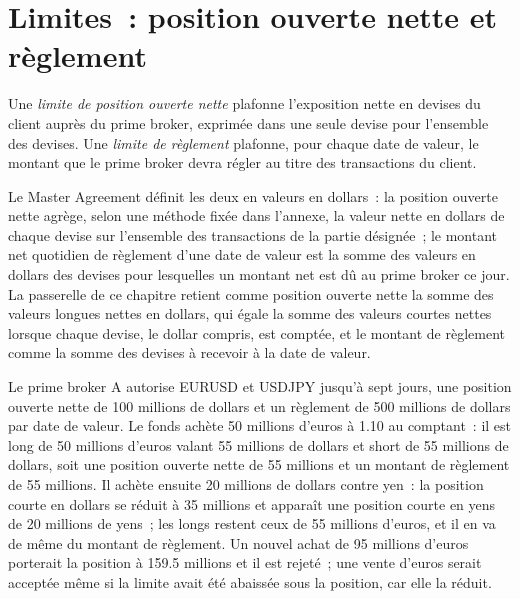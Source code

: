\section{Limites~: position ouverte nette et règlement}

\begin{definition}\label{def:m2:getting-access-fx:limits}
Une \emph{limite de position ouverte nette} plafonne l'exposition
nette en devises du client auprès du prime broker, exprimée dans une seule devise pour l'ensemble
des devises. Une \emph{limite de règlement} plafonne, pour chaque date de valeur,
le montant que le prime broker devra régler au titre des transactions du client.
\end{definition}

Le Master Agreement définit les deux en valeurs en dollars~: la position ouverte nette agrège,
selon une méthode fixée dans l'annexe, la valeur nette en dollars de chaque devise sur l'ensemble
des transactions de la partie désignée~; le montant net quotidien de règlement d'une date de valeur est la somme
des valeurs en dollars des devises pour lesquelles un montant net est dû au prime broker ce
jour. La passerelle de ce chapitre retient comme position ouverte nette la somme des valeurs longues nettes en
dollars, qui égale la somme des valeurs courtes nettes lorsque chaque devise, le dollar
compris, est comptée, et le montant de règlement comme la somme des devises à
recevoir à la date de valeur.

\begin{example}\label{ex:m2:getting-access-fx:nop}
Le prime broker A autorise EURUSD et USDJPY jusqu'à sept jours, une position ouverte nette de 100
millions de dollars et un règlement de 500 millions de dollars par date de valeur. Le fonds achète 50 millions d'euros
à 1.10 au comptant~: il est long de 50 millions d'euros valant 55 millions de dollars et short de 55 millions de dollars, soit une
position ouverte nette de 55 millions et un montant de règlement de 55 millions. Il achète ensuite 20
millions de dollars contre yen~: la position courte en dollars se réduit à 35 millions et apparaît une position courte en yens de 20
millions de yens~; les longs restent ceux de 55 millions d'euros, et il en va de même du montant
de règlement. Un nouvel achat de 95 millions d'euros porterait la position à 159.5 millions
et il est rejeté~; une vente d'euros serait acceptée même si la limite avait été abaissée sous
la position, car elle la réduit.
\end{example}

